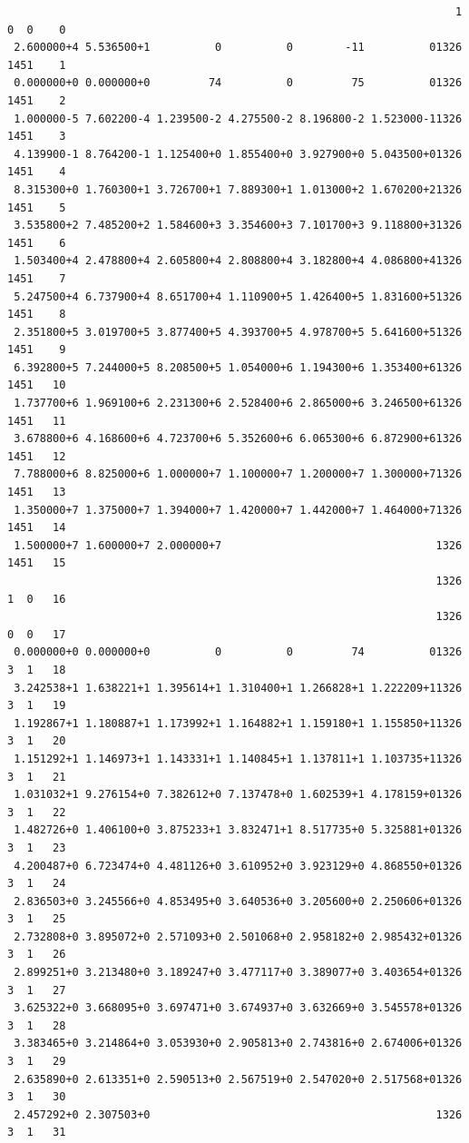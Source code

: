 \small
\begin{verbatim}
                                                                     1 0  0    0
 2.600000+4 5.536500+1          0          0        -11          01326 1451    1
 0.000000+0 0.000000+0         74          0         75          01326 1451    2
 1.000000-5 7.602200-4 1.239500-2 4.275500-2 8.196800-2 1.523000-11326 1451    3
 4.139900-1 8.764200-1 1.125400+0 1.855400+0 3.927900+0 5.043500+01326 1451    4
 8.315300+0 1.760300+1 3.726700+1 7.889300+1 1.013000+2 1.670200+21326 1451    5
 3.535800+2 7.485200+2 1.584600+3 3.354600+3 7.101700+3 9.118800+31326 1451    6
 1.503400+4 2.478800+4 2.605800+4 2.808800+4 3.182800+4 4.086800+41326 1451    7
 5.247500+4 6.737900+4 8.651700+4 1.110900+5 1.426400+5 1.831600+51326 1451    8
 2.351800+5 3.019700+5 3.877400+5 4.393700+5 4.978700+5 5.641600+51326 1451    9
 6.392800+5 7.244000+5 8.208500+5 1.054000+6 1.194300+6 1.353400+61326 1451   10
 1.737700+6 1.969100+6 2.231300+6 2.528400+6 2.865000+6 3.246500+61326 1451   11
 3.678800+6 4.168600+6 4.723700+6 5.352600+6 6.065300+6 6.872900+61326 1451   12
 7.788000+6 8.825000+6 1.000000+7 1.100000+7 1.200000+7 1.300000+71326 1451   13
 1.350000+7 1.375000+7 1.394000+7 1.420000+7 1.442000+7 1.464000+71326 1451   14
 1.500000+7 1.600000+7 2.000000+7                                 1326 1451   15
                                                                  1326 1  0   16
                                                                  1326 0  0   17
 0.000000+0 0.000000+0          0          0         74          01326 3  1   18
 3.242538+1 1.638221+1 1.395614+1 1.310400+1 1.266828+1 1.222209+11326 3  1   19
 1.192867+1 1.180887+1 1.173992+1 1.164882+1 1.159180+1 1.155850+11326 3  1   20
 1.151292+1 1.146973+1 1.143331+1 1.140845+1 1.137811+1 1.103735+11326 3  1   21
 1.031032+1 9.276154+0 7.382612+0 7.137478+0 1.602539+1 4.178159+01326 3  1   22
 1.482726+0 1.406100+0 3.875233+1 3.832471+1 8.517735+0 5.325881+01326 3  1   23
 4.200487+0 6.723474+0 4.481126+0 3.610952+0 3.923129+0 4.868550+01326 3  1   24
 2.836503+0 3.245566+0 4.853495+0 3.640536+0 3.205600+0 2.250606+01326 3  1   25
 2.732808+0 3.895072+0 2.571093+0 2.501068+0 2.958182+0 2.985432+01326 3  1   26
 2.899251+0 3.213480+0 3.189247+0 3.477117+0 3.389077+0 3.403654+01326 3  1   27
 3.625322+0 3.668095+0 3.697471+0 3.674937+0 3.632669+0 3.545578+01326 3  1   28
 3.383465+0 3.214864+0 3.053930+0 2.905813+0 2.743816+0 2.674006+01326 3  1   29
 2.635890+0 2.613351+0 2.590513+0 2.567519+0 2.547020+0 2.517568+01326 3  1   30
 2.457292+0 2.307503+0                                            1326 3  1   31

\end{verbatim}
